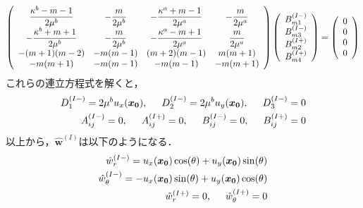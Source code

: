 \begin{align}
	\left(
	\begin{array}{cccc}
		{\displaystyle\frac{ \kappa^b-m-1}{2\mu^{b}}}& {\displaystyle-\frac{m}{2\mu^{b}}} &
		{\displaystyle-\frac{\kappa^a+m-1}{2\mu^{a}}} & {\displaystyle-\frac{m}{2\mu^{a}}} \\
		{\displaystyle-\frac{\kappa^b+m+1}{2\mu^{b}}} & {\displaystyle-\frac{m}{2\mu^{b}}} &
		{\displaystyle-\frac{\kappa^a-m+1}{2\mu^{a}}} & {\displaystyle \frac{m}{2\mu^{a}}} \\
		-(m+1)(m-2) & -m(m-1) & (m+2)(m-1) & m(m+1) \\
		-m(m+1) & -m(m-1) & -m(m-1) & -m(m+1)\\
	\end{array}
	\right)
	\left(
	\begin{array}{c}
		B_{m1}^{(I-)} \\
	 	B_{m3}^{(I-)} \\
		B_{m2}^{(I+)}\\
	 	B_{m4}^{(I+)} \\
	\end{array}
	\right)
	=
	\left(
	\begin{array}{c}
		0 \\
	 	0 \\
		0 \\
	 	0 \\
	\end{array}
	\right)
\end{align}
これらの連立方程式を解くと，
\begin{align}
	D_{1}^{(I-)}=2\mu^{b}u_{x}(\bm{x_{0}}),\hspace{0.5cm}
	D_{2}^{(I-)}=2\mu^{b}u_{y}(\bm{x_{0}}),\hspace{0.5cm}D_{3}^{(I-)}=0
	\nonumber
	\\
	A_{ij}^{(I-)}=0,\hspace{0.5cm}A_{ij}^{(I+)}=0,\hspace{0.5cm}
	B_{ij}^{(I-)}=0,\hspace{0.5cm}B_{ij}^{(I+)}=0
\end{align}
以上から，$\hat{\bm{w}}^{(I)}$は以下のようになる．
\begin{align}
	\hat{w}_{r}^{(I-)}=u_{x}(\bm{x_{0}})\cos(\theta)+u_{y}(\bm{x_{0}})\sin(\theta)
	\nonumber
	\\
	\hat{w}_{\theta}^{(I-)}=-u_{x}(\bm{x_{0}})\sin(\theta)+u_{y}(\bm{x_{0}})\cos(\theta)
	\nonumber
	\\
	\hat{w}_{r}^{(I+)}=0,\hspace{0.5cm}\hat{w}_{\theta}^{(I+)}=0
\end{align}

\newpage
